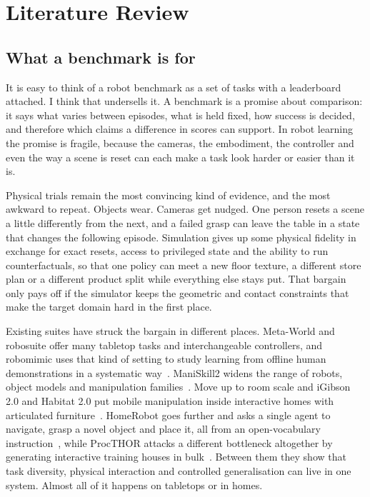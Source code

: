 \chapter{Literature Review}
\label{chap:literature}
\begingroup
\justifying
\setlength{\parindent}{2em}
\setlength{\parskip}{0.55\baselineskip}

\section{What a benchmark is for}

It is easy to think of a robot benchmark as a set of tasks with a leaderboard attached. I think that undersells it. A benchmark is a promise about comparison: it says what varies between episodes, what is held fixed, how success is decided, and therefore which claims a difference in scores can support. In robot learning the promise is fragile, because the cameras, the embodiment, the controller and even the way a scene is reset can each make a task look harder or easier than it is.

Physical trials remain the most convincing kind of evidence, and the most awkward to repeat. Objects wear. Cameras get nudged. One person resets a scene a little differently from the next, and a failed grasp can leave the table in a state that changes the following episode. Simulation gives up some physical fidelity in exchange for exact resets, access to privileged state and the ability to run counterfactuals, so that one policy can meet a new floor texture, a different store plan or a different product split while everything else stays put. That bargain only pays off if the simulator keeps the geometric and contact constraints that make the target domain hard in the first place.

Existing suites have struck the bargain in different places. Meta-World and robosuite offer many tabletop tasks and interchangeable controllers, and robomimic uses that kind of setting to study learning from offline human demonstrations in a systematic way~\cite{yu2020metaworld,zhu2020robosuite,mandlekar2021whatmatters}. ManiSkill2 widens the range of robots, object models and manipulation families~\cite{gu2023maniskill2}. Move up to room scale and iGibson 2.0 and Habitat 2.0 put mobile manipulation inside interactive homes with articulated furniture~\cite{li2022igibson2,szot2021habitat2}. HomeRobot goes further and asks a single agent to navigate, grasp a novel object and place it, all from an open-vocabulary instruction~\cite{yenamandra2023homerobot}, while ProcTHOR attacks a different bottleneck altogether by generating interactive training houses in bulk~\cite{deitke2022procthor}. Between them they show that task diversity, physical interaction and controlled generalisation can live in one system. Almost all of it happens on tabletops or in homes.

